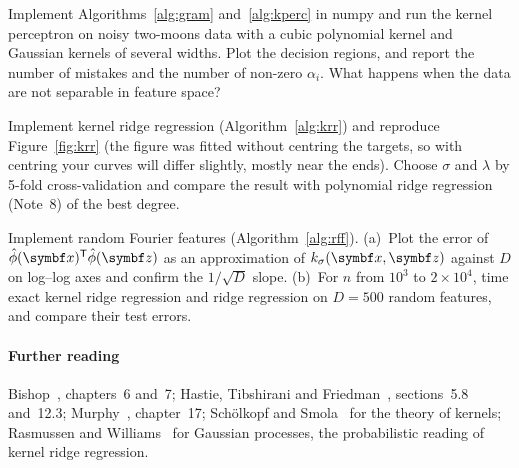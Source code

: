 \documentclass[11pt]{article}
\newcommand{\z}{\vect{z}}
\begin{document}
\begin{questions}
\begin{programming}
\item Implement Algorithms~\ref{alg:gram} and~\ref{alg:kperc} in numpy and run the kernel perceptron on noisy two-moons
  data with a cubic polynomial kernel and Gaussian kernels of several widths. Plot the decision regions, and report the
  number of mistakes and the number of non-zero $\alpha_i$. What happens when the data are not separable in feature space?
\item Implement kernel ridge regression (Algorithm~\ref{alg:krr}) and reproduce Figure~\ref{fig:krr} (the figure was
  fitted without centring the targets, so with centring your curves will differ slightly, mostly near the ends). Choose $\sigma$ and
  $\lambda$ by 5-fold cross-validation and compare the result with polynomial ridge regression (Note~8) of the best degree.
\item Implement random Fourier features (Algorithm~\ref{alg:rff}). (a)~Plot the error of $\hat\phi(\x)\T\hat\phi(\z)$ as an
  approximation of $k_\sigma(\x, \z)$ against $D$ on log--log axes and confirm the $1/\sqrt D$ slope. (b)~For $n$ from
  $10^3$ to $2 \times 10^4$, time exact kernel ridge regression and ridge regression on $D = 500$ random features, and
  compare their test errors.
\end{programming}
\end{questions}

\paragraph{Further reading} Bishop~\cite{bishop2006}, chapters~6 and~7; Hastie, Tibshirani and Friedman~\cite{hastie2009},
sections~5.8 and~12.3; Murphy~\cite{murphy2022}, chapter~17; Sch\"olkopf and Smola~\cite{scholkopf2002} for the theory of
kernels; Rasmussen and Williams~\cite{rasmussen2006} for Gaussian processes, the probabilistic reading of kernel ridge
regression.
\end{document}
